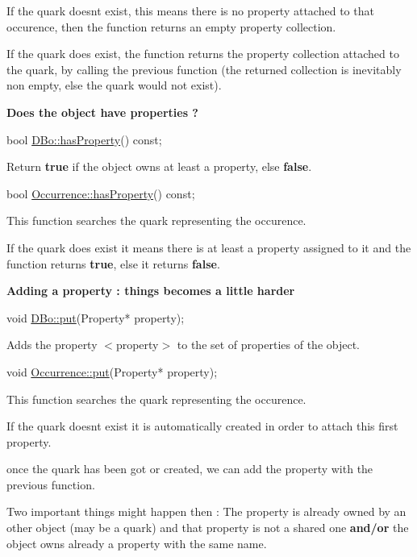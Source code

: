 If the quark doesn\textquotesingle{}t exist, this means there is no property attached to that occurence, then the function returns an empty property collection.

If the quark does exist, the function returns the property collection attached to the quark, by calling the previous function (the returned collection is inevitably non empty, else the quark would not exist).

{\bfseries Does the object have properties ?} 
\begin{DoxyCode}
\textcolor{keywordtype}{bool} \hyperlink{classHurricane_1_1DBo_a1563f094565030c77592ed82f9a9989b}{DBo::hasProperty}() \textcolor{keyword}{const};
\end{DoxyCode}
 Return {\bfseries true} if the object owns at least a property, else {\bfseries false}. 
\begin{DoxyCode}
\textcolor{keywordtype}{bool} \hyperlink{classHurricane_1_1Occurrence_a0c1c6cfdf47f33166d108e2311d74e48}{Occurrence::hasProperty}() \textcolor{keyword}{const};
\end{DoxyCode}
 This function searches the quark representing the occurence.

If the quark does exist it means there is at least a property assigned to it and the function returns {\bfseries true}, else it returns {\bfseries false}.

{\bfseries Adding a property \+: things becomes a little harder} 
\begin{DoxyCode}
\textcolor{keywordtype}{void} \hyperlink{classHurricane_1_1DBo_a8979674f11507cb4c7c5251b41ed72d5}{DBo::put}(Property* property);
\end{DoxyCode}
 Adds the property {\ttfamily $<$property$>$} to the set of properties of the object. 
\begin{DoxyCode}
\textcolor{keywordtype}{void} \hyperlink{classHurricane_1_1Occurrence_aaea0bdc4f5bb4012eb52f3abe20525be}{Occurrence::put}(Property* property);
\end{DoxyCode}
 This function searches the quark representing the occurence.

If the quark doesn\textquotesingle{}t exist it is automatically created in order to attach this first property.

once the quark has been got or created, we can add the property with the previous function.

Two important things might happen then \+: The property is already owned by an other object (may be a quark) and that property is not a shared one {\bfseries and/or} the object owns already a property with the same name.

